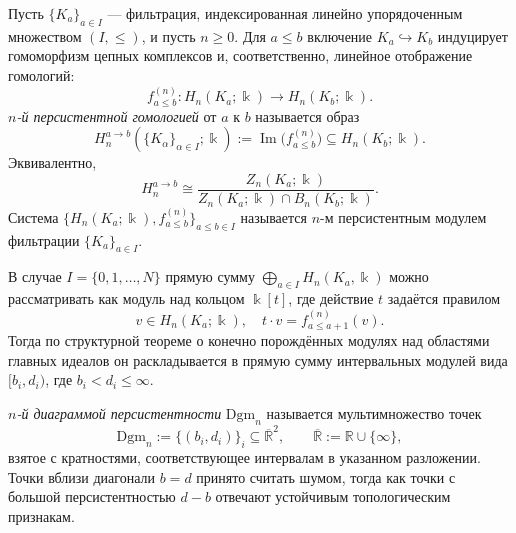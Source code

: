\begin{definition}
Пусть $\{K_a\}_{a \in I}$ --- фильтрация, индексированная линейно упорядоченным множеством $(I, \le)$, и пусть $n \ge 0$.
Для $a\le b$ включение $K_a\hookrightarrow K_b$ индуцирует гомоморфизм цепных комплексов и, соответственно, линейное отображение гомологий:
\[
f^{(n)}_{a\le b}: H_n(K_a;\Bbbk)\to H_n(K_b;\Bbbk).
\]
\emph{$n$-й персистентной гомологией} от $a$ к $b$ называется образ
\[
H_n^{a\to b}(\{K_\alpha\}_{\alpha \in I};\Bbbk) := \operatorname{Im}\bigl(f^{(n)}_{a\le b}\bigr)\subseteq H_n(K_b;\Bbbk).
\]
Эквивалентно,
\[
H_n^{a\to b} \cong \frac{Z_n(K_a;\Bbbk)}{Z_n(K_a;\Bbbk)\cap B_n(K_b;\Bbbk)}.
\]
Система $\{H_n(K_a;\Bbbk), f^{(n)}_{a\le b}\}_{a\le b \in I}$ называется $n$-м персистентным модулем фильтрации $\{K_a\}_{a \in I}$.
\end{definition}

\begin{definition}
В случае $I = \{0, 1, \dots, N\}$ прямую сумму $\bigoplus_{a \in I} H_n(K_a, \Bbbk)$ можно рассматривать как модуль над кольцом $\Bbbk[t]$, где действие $t$ задаётся правилом
\[
v \in H_n(K_a; \Bbbk), \quad t \cdot v = f^{(n)}_{a \le a+1}(v).
\]
Тогда по структурной теореме о конечно порождённых модулях над областями главных идеалов он раскладывается в прямую сумму интервальных модулей вида $[b_i, d_i)$, где $b_i < d_i \le \infty$.

\emph{$n$-й диаграммой персистентности} $\mathrm{Dgm}_n$ называется мультимножество точек
\[
\mathrm{Dgm}_n := \{(b_i, d_i)\}_i \subseteq \overline{\mathbb{R}}^2, \qquad \overline{\mathbb{R}} := \mathbb{R} \cup \{\infty\},
\]
взятое с кратностями, соответствующее интервалам в указанном разложении. Точки вблизи диагонали $b = d$ принято считать шумом, тогда как точки с большой персистентностью $d - b$ отвечают устойчивым топологическим признакам.
\end{definition}
